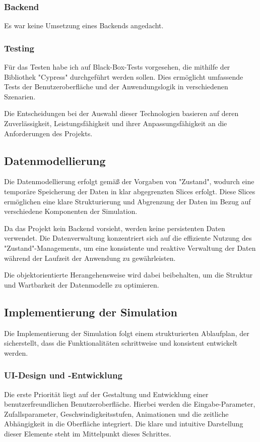 \documentclass[hidelinks,12pt]{article}
\begin{document}
\subsubsection{Backend}
Es war keine Umsetzung eines Backends angedacht.

\subsubsection{Testing}
Für das Testen habe ich auf Black-Box-Tests vorgesehen, die mithilfe der Bibliothek "Cypress" durchgeführt werden sollen. Dies ermöglicht umfassende Tests der Benutzeroberfläche und der Anwendungslogik in verschiedenen Szenarien.

Die Entscheidungen bei der Auswahl dieser Technologien basieren auf deren Zuverlässigkeit, Leistungsfähigkeit und ihrer Anpassungsfähigkeit an die Anforderungen des Projekts.

\subsection{Datenmodellierung}
Die Datenmodellierung erfolgt gemäß der Vorgaben von "Zustand", wodurch eine temporäre Speicherung der Daten in klar abgegrenzten Slices erfolgt. Diese Slices ermöglichen eine klare Strukturierung und Abgrenzung der Daten im Bezug auf verschiedene Komponenten der Simulation.

Da das Projekt kein Backend vorsieht, werden keine persistenten Daten verwendet. Die Datenverwaltung konzentriert sich auf die effiziente Nutzung des "Zustand"-Managements, um eine konsistente und reaktive Verwaltung der Daten während der Laufzeit der Anwendung zu gewährleisten.

Die objektorientierte Herangehensweise wird dabei beibehalten, um die Struktur und Wartbarkeit der Datenmodelle zu optimieren.

\subsection{Implementierung der Simulation}
Die Implementierung der Simulation folgt einem strukturierten Ablaufplan, der sicherstellt, dass die Funktionalitäten schrittweise und konsistent entwickelt werden.

\subsubsection{UI-Design und -Entwicklung}
Die erste Priorität liegt auf der Gestaltung und Entwicklung einer benutzerfreundlichen Benutzeroberfläche. Hierbei werden die Eingabe-Parameter, Zufallsparameter, Geschwindigkeitsstufen, Animationen und die zeitliche Abhängigkeit in die Oberfläche integriert. Die klare und intuitive Darstellung dieser Elemente steht im Mittelpunkt dieses Schrittes.
\end{document}

